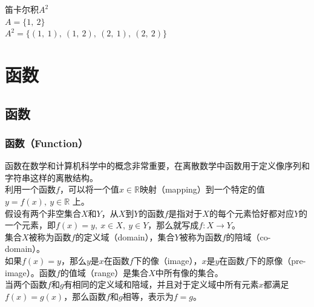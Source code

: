 \documentclass[12pt, openany, oneside]{book}
\begin{document}
\begin{tcolorbox}
	笛卡尔积$ A^2 $\\
	$ A = \{1,\ 2\} $\\
	$ A^2 = \{(1,\ 1),\ (1,\ 2),\ (2,\ 1),\ (2,\ 2)\} $
\end{tcolorbox}

\newpage

\chapter{函数}

\section{函数}

\subsection{函数（Function）}

函数在数学和计算机科学中的概念非常重要，在离散数学中函数用于定义像序列和字符串这样的离散结构。\\

利用一个函数$ f $，可以将一个值$ x \in \mathbb{R} $映射（mapping）到一个特定的值$ y = f(x),\ y \in \mathbb{R} $ 上。\\

假设有两个非空集合$ X $和$ Y $，从$ X $到$ Y $的函数$ f $是指对于$ X $的每个元素恰好都对应$ Y $的一个元素，即$ f(x) = y,\ x \in X,\ y \in Y $，那么就写成$ f: X \rightarrow Y $。\\

集合$ X $被称为函数$ f $的定义域（domain），集合$ Y $被称为函数$ f $的陪域（co-domain）。\\

如果$ f(x) = y $，那么$ y $是$ x $在函数$ f $下的像（image），$ x $是$ y $在函数$ f $下的原像（pre-image）。函数$ f $的值域（range）是集合$ X $中所有像的集合。\\

当两个函数$ f $和$ g $有相同的定义域和陪域，并且对于定义域中所有元素$ x $都满足$ f(x) = g(x) $，那么函数$ f $和$ g $相等，表示为$ f = g $。
\end{document}
